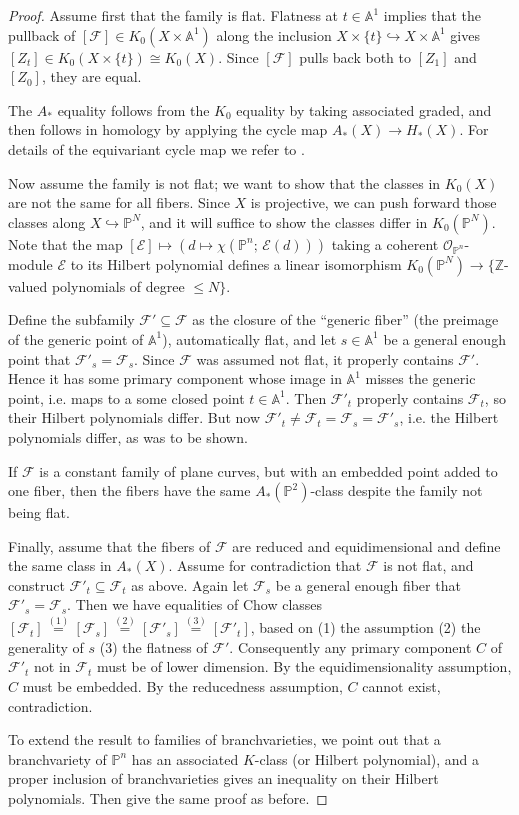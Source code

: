 \documentclass[11pt]{amsart}
\theoremstyle{definition}
\newcommand{\ZZ}{\mathbb{Z}}
\newcommand{\PP}{\mathbb{P}}
\def\AA{{\mathbb A }}
\newcommand\calO{{\mathcal O}}
\newcommand\calF{{\mathcal F}}
\newcommand\calE{{\mathcal E}}
\renewcommand\AA{{\mathbb A}}
\newcommand\into\hookrightarrow
\newcommand\iso\cong
\begin{document}
\begin{proof}
  Assume first that the family is flat.
  Flatness at $t \in \AA^1$ implies that the pullback of
  $[\calF] \in K_0(X \times \AA^1)$ along the inclusion
  $X\times \{t\} \into X\times \AA^1$ gives $[Z_t] \in K_0(X\times \{t\})
  \iso K_0(X)$.
  Since $[\calF]$ pulls back both to $[Z_1]$ and $[Z_0]$, they are equal.

  The $A_*$ equality follows from the $K_0$ equality by taking associated
  graded, and then follows in homology by applying the cycle map
  $A_*(X) \to H_*(X)$. For details of the equivariant cycle map we refer
  to \cite{edidin1998equivariant}.

  Now assume the family is not flat; we want to show that the classes
  in $K_0(X)$ are not the same for all fibers. Since $X$ is projective,
  we can push forward those classes along $X\into \PP^N$, and it
  will suffice to show the classes differ in $K_0(\PP^N)$.
  Note that the map $[\calE] \mapsto (d \mapsto \chi(\PP^n;\, \calE(d)))$
  taking a coherent $\calO_{\PP^n}$-module $\calE$ to its
  Hilbert polynomial defines a linear isomorphism
  $K_0(\PP^N) \to \{\ZZ$-valued polynomials of degree $\leq N\}$.

  Define the subfamily $\calF' \subseteq \calF$ as the closure of the
  ``generic fiber'' (the preimage of the generic point of $\AA^1$),
  automatically flat, and let $s\in\AA^1$ be
  a general enough point that $\calF'_s = \calF_s$. 
  Since $\calF$ was assumed not flat,
  it properly contains $\calF'$. Hence it has some primary component
  whose image in $\AA^1$ misses the generic point, i.e. maps to a some
  closed point $t\in \AA^1$.  Then $\calF'_t$ properly contains
  $\calF_t$, so their Hilbert polynomials differ. But now
  $\calF'_t \neq \calF_t = \calF_s = \calF'_s$, i.e. the Hilbert
  polynomials differ, as was to be shown.

  If $\calF$ is a constant family of plane curves, but with an embedded
  point added to one fiber, then the fibers have the same $A_*(\PP^2)$-class
  despite the family not being flat.

  Finally, assume that the fibers of $\calF$ are reduced and equidimensional
  and define the same class in $A_*(X)$. Assume for contradiction that
  $\calF$ is not flat, and construct $\calF'_t \subseteq \calF_t$
  as above. Again let $\calF_s$ be a general enough fiber that
  $\calF'_s = \calF_s$. Then we have equalities of Chow classes
  $[\calF_t] \stackrel{(1)}= [\calF_s] \stackrel{(2)}= [\calF'_s]
  \stackrel{(3)}= [\calF'_t]$, based on (1) the assumption (2) the
  generality of $s$ (3) the flatness of $\calF'$. Consequently any
  primary component $C$ of $\calF'_t$ not in $\calF_t$ must be of lower
  dimension. By the equidimensionality assumption, $C$ must be embedded.
  By the reducedness assumption, $C$ cannot exist, contradiction.

  To extend the result to families of branchvarieties, we point out
  that a branchvariety of $\PP^n$ has an associated $K$-class (or Hilbert
  polynomial), and a proper inclusion of branchvarieties gives an
  inequality on their Hilbert polynomials. Then give the same proof as before.
\end{proof}
\end{document}
